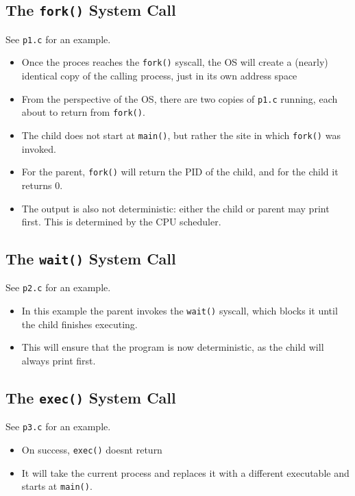\documentclass[11pt, a4paper]{article}
\theoremstyle{definition}
\theoremstyle{remark}
\begin{document}
\subsection{The \texttt{fork()} System Call}
See \texttt{p1.c} for an example.
\begin{itemize}
  \item Once the proces reaches the \texttt{fork()} syscall, the OS will create a (nearly) identical copy of the calling process, just in its own address space
  \item From the perspective of the OS, there are two copies of \texttt{p1.c} running, each about to return from \texttt{fork()}. 
  \item The child does not start at \texttt{main()}, but rather the site in which \texttt{fork()} was invoked.
  \item For the parent, \texttt{fork()} will return the PID of the child, and for the child it returns 0.
  \item The output is also not deterministic: either the child or parent may print first. This is determined by the CPU scheduler. 
\end{itemize}
\subsection{The \texttt{wait()} System Call}
See \texttt{p2.c} for an example.
\begin{itemize}
  \item In this example the parent invokes the \texttt{wait()} syscall, which blocks it until the child finishes executing. 
  \item This will ensure that the program is now deterministic, as the child will always print first. 
\end{itemize}
\subsection{The \texttt{exec()} System Call}
See \texttt{p3.c} for an example.
\begin{itemize}
  \item On success, \texttt{exec()} doesnt return
  \item It will take the current process and replaces it with a different executable and starts at \texttt{main()}.
\end{itemize}
\end{document}
